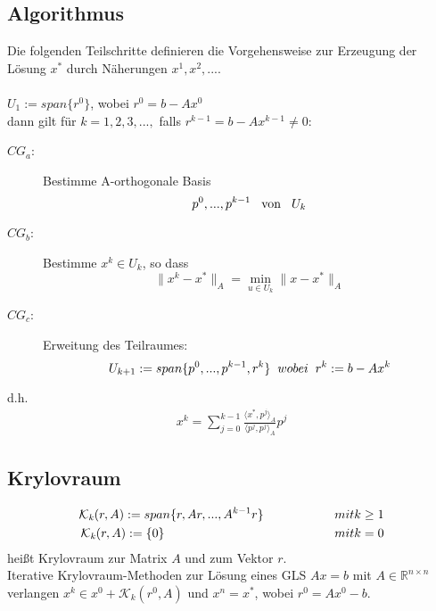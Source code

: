 \documentclass{article}
\begin{document}
\subsection*{Algorithmus}
Die folgenden Teilschritte definieren die Vorgehensweise zur Erzeugung der Lösung $x^{*}$ durch Näherungen $x^{1}, x^{2},...$.
\\\\$U_{1} := span\{r^{0}\}$, wobei $r^{0} = b - Ax^{0}$
\\dann gilt für $k = 1,2,3,...,$ falls $r^{k-1} = b - Ax^{k-1} \ne 0$:
\begin{description}
\item[$CG_{a}$:] Bestimme A-orthogonale Basis
\begin{equation}
p^{0},...,p^{k-1} \hspace{3mm} \textnormal{von} \hspace{3mm} U_{k}
\end{equation}
\item[$CG_{b}$:] Bestimme $x^{k} \in U_{k}$, so dass
\begin{equation}
\|x^{k} - x^{*}\|_{A} = \underset{u \in U_{k}}{\min} \|x - x^{*}\|_{A}
\end{equation}
\item[$CG_{c}$:] Erweitung des Teilraumes:
\begin{equation}
U_{k+1} := span\{p^{0},...,p^{k-1},r^{k}\} \hspace{2mm} wobei \hspace{2mm} r^{k} := b - Ax^{k}
\end{equation}
\end{description}
d.h.
\begin{align}
x^{k} = \sum_{j=0}^{k-1} \frac {\langle x^{*}, p^{j} \rangle _{A}} {\langle p^{j}, p^{j} \rangle _{A}} p^{j}
\end{align}

\subsection*{Krylovraum}
\begin{align*}
\mathcal{K}_{\mathit{k}}(r, A) := span\{r, Ar, ..., A^{k-1}r\} \hspace{20mm} mit \hfill k \ge 1\\
\mathcal{K}_{\mathit{k}}(r, A) := \{0\} \hspace{48mm} mit \hfill k = 0
\end{align*}
heißt Krylovraum zur Matrix $A$ und zum Vektor $r$.
\\Iterative Krylovraum-Methoden zur Lösung eines GLS $Ax = b$ mit $A \in \mathbb{R}^{n \times n}$ verlangen $x^k \in x^{0} + \mathcal{K}_{\mathit{k}}(r^{0}, A)$ und $x^{n} = x^{*}$, wobei $r^{0} = Ax^{0} - b$.
\end{document}
